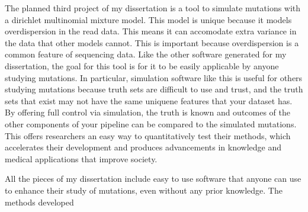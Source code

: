 \documentclass{article}
\begin{document}
The planned third project of my dissertation is a tool to simulate mutations with a dirichlet multinomial mixture model.
This model is unique because it models overdispersion in the read data. This means it can accomodate extra variance in the data that other models cannot.
This is important because overdispersion is a common feature of sequencing data.
Like the other software generated for my dissertation, the goal for this tool is for it to be easily applicable by anyone studying mutations.
In particular, simulation software like this is useful for others studying mutations because truth sets are difficult to use and trust, and the truth sets that exist may not have the same uniquene features that your dataset has.
By offering full control via simulation, the truth is known and outcomes of the other components of your pipeline can be compared to the simulated mutations.
This offers researchers an easy way to quantitatively test their methods, which accelerates their development and produces advancements in knowledge and medical applications that improve society.

All the pieces of my dissertation include easy to use software that anyone can use to enhance their study of mutations, even without any prior knowledge.
The methods developed 
\end{document}
